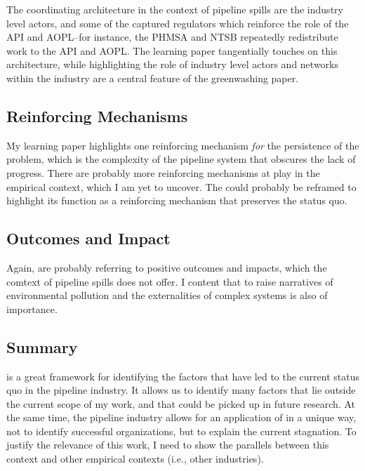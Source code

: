 \documentclass{article}
\begin{document}
The coordinating architecture in the context of pipeline spills are the industry level actors, and some of the captured regulators which reinforce the role of the API and AOPL--for instance, the PHMSA and NTSB repeatedly redistribute work to the API and AOPL. The learning paper tangentially touches on this architecture, while highlighting the role of industry level actors and networks within the industry are a central feature of the greenwashing paper.

\subsection*{Reinforcing Mechanisms}

My learning paper highlights one reinforcing mechanism \textit{for} the persistence of the problem, which is the complexity of the pipeline system that obscures the lack of progress. There are probably more reinforcing mechanisms at play in the empirical context, which I am yet to uncover. The  could probably be reframed to highlight its function as a reinforcing mechanism that preserves the status quo.

\subsection*{Outcomes and Impact}

Again, \citet{George2016} are probably referring to positive outcomes and impacts, which the comtext of pipeline spills does not offer. I content that to raise narratives of environmental pollution and the externalities of complex systems is also of importance.

\subsection*{Summary}

\citet{George2016} is a great framework for identifying the factors that have led to the current status quo in the pipeline industry. It allows us to identify many factors that lie outside the current scope of my work, and that could be picked up in future research. At the same time, the pipeline industry allows for an application of \citet{George2016} in a unique way, not to identify successful organizations, but to explain the current stagnation. To justify the relevance of this work, I need to show the parallels between this context and other empirical contexts (i.e., other industries).
\end{document}
